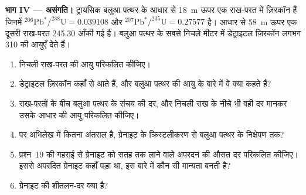 \begin{problem}
\noindent\textbf{भाग IV --- असंगति।} ट्रायसिक बलुआ पत्थर के आधार से \qty{18}{m} ऊपर एक राख-परत में ज़िरकॉन हैं जिनमें $^{206}\mathrm{Pb}^*/^{238}\mathrm{U} = 0.039108$ और $^{207}\mathrm{Pb}^*/^{235}\mathrm{U} = 0.27577$ है। आधार से \qty{58}{m} ऊपर एक दूसरी राख-परत \qty{245.30}{\Ma} आँकी गई है। बलुआ पत्थर के सबसे निचले मीटर में डेट्राइटल ज़िरकॉन लगभग \qty{310}{\Ma} की आयुएँ देते हैं।
\begin{enumerate}[resume]
  \item निचली राख-परत की आयु परिकलित कीजिए।
  \item डेट्राइटल ज़िरकॉन कहाँ से आते हैं, और बलुआ पत्थर की आयु के बारे में वे क्या कहते हैं?
  \item राख-परतों के बीच बलुआ पत्थर के संचय की दर, और निचली राख के नीचे भी वही दर मानकर उसके आधार की आयु परिकलित कीजिए।
  \item {} पर अभिलेख में कितना अंतराल है, ग्रेनाइट के क्रिस्टलीकरण से बलुआ पत्थर के निक्षेपण तक?
  \item प्रश्न~19 की गहराई से ग्रेनाइट को सतह तक लाने वाले अपरदन की औसत दर परिकलित कीजिए। इससे अपरदित ग्रेनाइट कहाँ पड़ा था, इस बारे में कौन सी मान्यता बनती है?
  \item ग्रेनाइट की शीतलन-दर क्या है?
\end{enumerate}
\end{problem}
